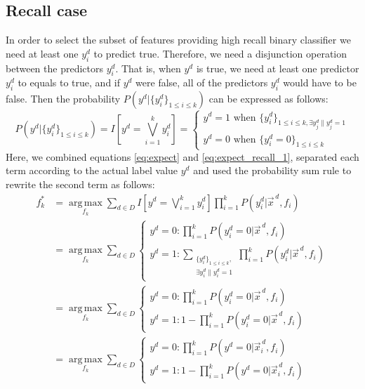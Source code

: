 \documentclass[11pt,a4paper]{article}
\begin{document}
\subsection{Recall case}
In order to select the subset of features providing high recall binary classifier we need at least one $y^d_i$ to predict true. Therefore, we need a disjunction operation between the predictors $y^d_i$. That is, when $y^d$ is true, we need at least one predictor $y^d_i$ to equals to true, and if $y^d$ were false, all of the predictors $y^d_i$ would have to be false. Then the probability $P\left(y^d|\{y^d_i\}_{1\leq i\leq k}\right)$ can be expressed as follows:
\begin{equation}
P\left(y^d|\{y^d_i\}_{1\leq i\leq k}\right)=I\left[y^d=\bigvee_{i=1}^k y^d_i\right]=
\begin{cases}
	y^d=1 \text{ when } \{y_i^d\}_{1\leq i\leq k,\exists{y_j^d\|y_j^d=1}}\\
	y^d=0 \text{ when } \{y_i^d=0\}_{1\leq i\leq k}
\end{cases}\label{eq:expect_recall_1}
\end{equation}
Here, we combined equations \eqref{eq:expect} and \eqref{eq:expect_recall_1}, separated each term according to the actual label value $y^d$ and used the probability sum rule to rewrite the second term as follows:
\begin{align}
f_k^*&=\operatorname*{arg\,max}_{f_k}\sum_{d\in D}I\left[y^d=\bigvee_{i=1}^k y^d_i\right]\prod_{i=1}^kP\left(y_i^d|\vec{x}^{\,d},f_i\right)\nonumber\\[0.5em]
&=\operatorname*{arg\,max}_{f_k}\sum_{d\in D}
\begin{cases}
	y^d=0: \prod_{i=1}^kP\left(y_i^d=0|\vec{x}^{\,d},f_i\right)\\
	y^d=1: \sum_{\substack{\{y_i^d\}_{1\leq i\leq k},\\ \exists{y_i^d\|y_i^d=1}}}\prod_{i=1}^kP\left(y_i^d|\vec{x}^{\,d},f_i\right)
\end{cases}\nonumber\\[0.5em]
&=\operatorname*{arg\,max}_{f_k}\sum_{d\in D}
\begin{cases}
	y^d=0: \prod_{i=1}^kP\left(y_i^d=0|\vec{x}^{\,d},f_i\right)\\
	y^d=1: 1-\prod_{i=1}^kP\left(y_i^d=0|\vec{x}^{\,d},f_i\right)
\end{cases}\label{eq:expect_recall_2}\\
&=\operatorname*{arg\,max}_{f_k}\sum_{d\in D}
\begin{cases}
	y^d=0: \prod_{i=1}^kP\left(y^d=0|\vec{x}_i^{\,d},f_i\right)\\
	y^d=1: 1-\prod_{i=1}^kP\left(y^d=0|\vec{x}_i^{\,d},f_i\right)
\end{cases}\nonumber
\end{align}
\end{document}
